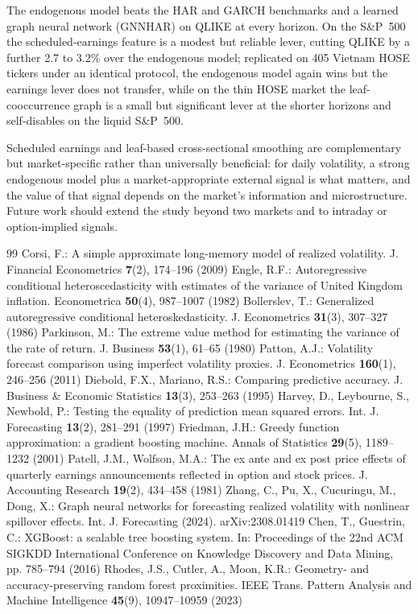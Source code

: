 \documentclass[runningheads]{llncs}
\begin{document}
The endogenous model beats the HAR and GARCH benchmarks and a learned graph neural network (GNNHAR) on
QLIKE at every horizon. On the S\&P~500 the scheduled-earnings feature is a modest but reliable lever,
cutting QLIKE by a further 2.7 to 3.2\% over the endogenous model; replicated on 405 Vietnam HOSE tickers
under an identical protocol, the endogenous model again wins but the earnings lever does not transfer,
while on the thin HOSE market the leaf-cooccurrence graph is a small but significant lever at the shorter
horizons and self-disables on the liquid S\&P~500.

Scheduled earnings and leaf-based cross-sectional smoothing are complementary but market-specific rather
than universally beneficial: for daily volatility, a strong endogenous model plus a market-appropriate
external signal is what matters, and the value of that signal depends on the market's information and
microstructure. Future work should extend the study beyond two markets and to intraday or option-implied
signals.

\begin{thebibliography}{99}
 Corsi, F.: A simple approximate long-memory model of realized volatility. J. Financial Econometrics \textbf{7}(2), 174--196 (2009)
 Engle, R.F.: Autoregressive conditional heteroscedasticity with estimates of the variance of United Kingdom inflation. Econometrica \textbf{50}(4), 987--1007 (1982)
 Bollerslev, T.: Generalized autoregressive conditional heteroskedasticity. J. Econometrics \textbf{31}(3), 307--327 (1986)
 Parkinson, M.: The extreme value method for estimating the variance of the rate of return. J. Business \textbf{53}(1), 61--65 (1980)
 Patton, A.J.: Volatility forecast comparison using imperfect volatility proxies. J. Econometrics \textbf{160}(1), 246--256 (2011)
 Diebold, F.X., Mariano, R.S.: Comparing predictive accuracy. J. Business \& Economic Statistics \textbf{13}(3), 253--263 (1995)
 Harvey, D., Leybourne, S., Newbold, P.: Testing the equality of prediction mean squared errors. Int. J. Forecasting \textbf{13}(2), 281--291 (1997)
 Friedman, J.H.: Greedy function approximation: a gradient boosting machine. Annals of Statistics \textbf{29}(5), 1189--1232 (2001)
 Patell, J.M., Wolfson, M.A.: The ex ante and ex post price effects of quarterly earnings announcements reflected in option and stock prices. J. Accounting Research \textbf{19}(2), 434--458 (1981)
 Zhang, C., Pu, X., Cucuringu, M., Dong, X.: Graph neural networks for forecasting realized volatility with nonlinear spillover effects. Int. J. Forecasting (2024). arXiv:2308.01419
 Chen, T., Guestrin, C.: XGBoost: a scalable tree boosting system. In: Proceedings of the 22nd ACM SIGKDD International Conference on Knowledge Discovery and Data Mining, pp. 785--794 (2016)
 Rhodes, J.S., Cutler, A., Moon, K.R.: Geometry- and accuracy-preserving random forest proximities. IEEE Trans. Pattern Analysis and Machine Intelligence \textbf{45}(9), 10947--10959 (2023)
\end{thebibliography}
\end{document}
